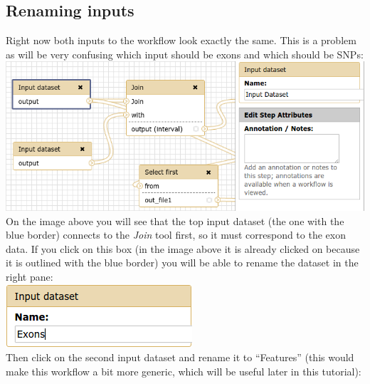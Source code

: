 \documentclass[11pt,a4paper]{article}
\begin{document}
\subsection{Renaming inputs}
Right now both inputs to the workflow look exactly the same. This is a problem as will be very confusing which input should be exons and which should be SNPs:\\
\includegraphics[scale=0.55]{figures/101_32}\\
On the image above you will see that the top input dataset (the one with the blue border) connects to the \textit{Join} tool first, so it must correspond to the exon data. If you click on this box (in the image above it is
already clicked on because it is outlined with the blue border) you will be able to rename the dataset in the right pane:\\
\includegraphics[scale=0.55]{figures/101_33}\\
Then click on the second input dataset and rename it to ``Features'' (this would make this workflow a bit more generic, which will be useful later in this tutorial):\\
\end{document}
